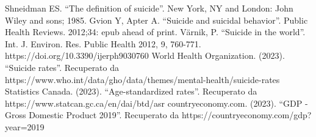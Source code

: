 \documentclass[conference]{IEEEtran}
\begin{document}
\begin{thebibliography}{00}
     Shneidman ES. ``The definition of suicide''. New York, NY and London: John Wiley and sons; 1985.
     Gvion Y, Apter A. ``Suicide and suicidal behavior''. Public Health Reviews. 2012;34: epub ahead of print.
     Värnik, P. ``Suicide in the world''. Int. J. Environ. Res. Public Health 2012, 9, 760-771. https://doi.org/10.3390/ijerph9030760 
     World Health Organization. (2023). ``Suicide rates''. Recuperato da https://www.who.int/data/gho/data/themes/mental-health/suicide-rates
     Statistics Canada. (2023). ``Age-standardized rates''. Recuperato da https://www.statcan.gc.ca/en/dai/btd/asr
     countryeconomy.com. (2023). ``GDP - Gross Domestic Product 2019''. Recuperato da https://countryeconomy.com/gdp?year=2019
\end{thebibliography}
\end{document}
